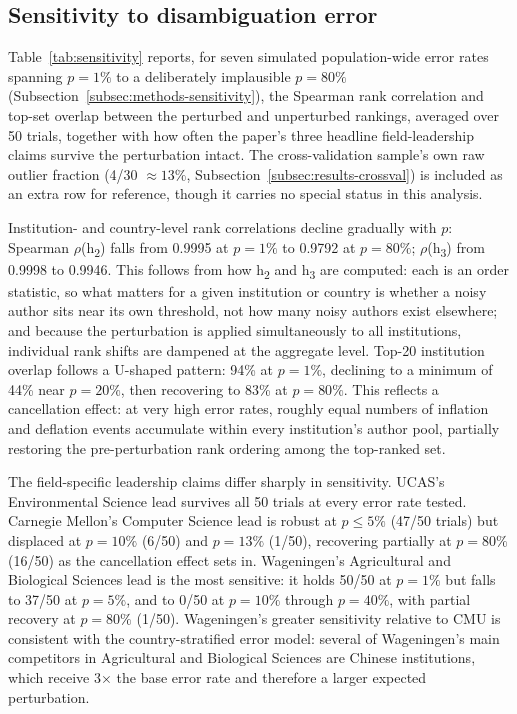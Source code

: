 \subsection{Sensitivity to disambiguation error}
\label{subsec:results-sensitivity}
Table~\ref{tab:sensitivity} reports, for seven simulated population-wide error rates spanning $p=1\%$ to a deliberately implausible $p=80\%$ (Subsection~\ref{subsec:methods-sensitivity}), the Spearman rank correlation and top-set overlap between the perturbed and unperturbed rankings, averaged over 50 trials, together with how often the paper's three headline field-leadership claims survive the perturbation intact. The cross-validation sample's own raw outlier fraction (4/30 $\approx 13\%$, Subsection~\ref{subsec:results-crossval}) is included as an extra row for reference, though it carries no special status in this analysis.

Institution- and country-level rank correlations decline gradually with $p$: Spearman $\rho$(h\textsubscript{2}) falls from 0.9995 at $p=1\%$ to 0.9792 at $p=80\%$; $\rho$(h\textsubscript{3}) from 0.9998 to 0.9946. This follows from how h\textsubscript{2} and h\textsubscript{3} are computed: each is an order statistic, so what matters for a given institution or country is whether a noisy author sits near its own threshold, not how many noisy authors exist elsewhere; and because the perturbation is applied simultaneously to all institutions, individual rank shifts are dampened at the aggregate level. Top-20 institution overlap follows a U-shaped pattern: 94\% at $p=1\%$, declining to a minimum of 44\% near $p=20\%$, then recovering to 83\% at $p=80\%$. This reflects a cancellation effect: at very high error rates, roughly equal numbers of inflation and deflation events accumulate within every institution's author pool, partially restoring the pre-perturbation rank ordering among the top-ranked set.

The field-specific leadership claims differ sharply in sensitivity. UCAS's Environmental Science lead survives all 50 trials at every error rate tested. Carnegie Mellon's Computer Science lead is robust at $p \leq 5\%$ (47/50 trials) but displaced at $p=10\%$ (6/50) and $p=13\%$ (1/50), recovering partially at $p=80\%$ (16/50) as the cancellation effect sets in. Wageningen's Agricultural and Biological Sciences lead is the most sensitive: it holds 50/50 at $p=1\%$ but falls to 37/50 at $p=5\%$, and to 0/50 at $p=10\%$ through $p=40\%$, with partial recovery at $p=80\%$ (1/50). Wageningen's greater sensitivity relative to CMU is consistent with the country-stratified error model: several of Wageningen's main competitors in Agricultural and Biological Sciences are Chinese institutions, which receive 3$\times$ the base error rate and therefore a larger expected perturbation.

